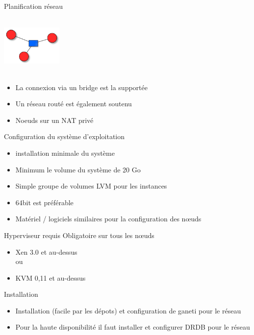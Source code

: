 \begin{frame}{Planification réseau}
\begin{center}
  \includegraphics[width=3cm,height=3cm]{images_presentation/network.png}
\end{center}
\begin{itemize}
\item La connexion via un bridge est la supportée
\pause
\item Un réseau routé est également soutenu
\pause
\item Noeuds sur un NAT privé
\end{itemize}
\end{frame}

\begin{frame}{Configuration du système d'exploitation}
\begin{itemize}
\item installation minimale du système
\pause
\item Minimum le volume du système de 20 Go
\pause
\item Simple groupe de volumes LVM pour les instances
\pause
\item 64bit est préférable
\pause
\item Matériel / logiciels similaires pour la configuration des nœuds
\end{itemize}
\end{frame}

\begin{frame}{Hyperviseur requis}
Obligatoire sur tous les nœuds
\begin{itemize}
\item Xen 3.0 et au-dessus \\ou
\pause
\item KVM 0,11 et au-dessus
\end{itemize}
\end{frame}

\begin{frame}{Installation}
\begin{itemize}
\item Installation (facile par les dépots) et configuration de ganeti pour le réseau
\pause
\item Pour la haute disponibilité il faut installer et configurer DRDB pour le réseau
\end{itemize}
\end{frame}

